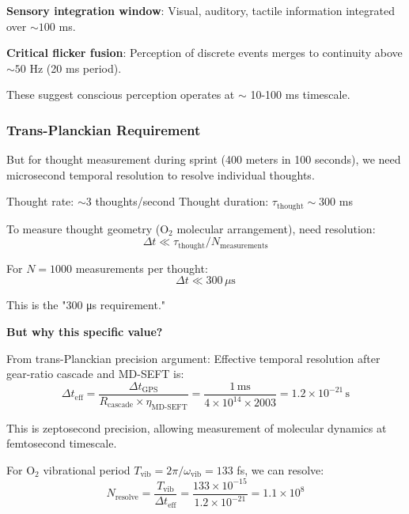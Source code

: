 \documentclass[11pt,onecolumn]{article}
\begin{document}
\textbf{Sensory integration window}: Visual, auditory, tactile information integrated over $\sim 100$ ms.

\textbf{Critical flicker fusion}: Perception of discrete events merges to continuity above $\sim 50$ Hz (20 ms period).

These suggest conscious perception operates at $\sim$ 10-100 ms timescale.

\subsubsection{Trans-Planckian Requirement}

But for thought measurement during sprint (400 meters in 100 seconds), we need microsecond temporal resolution to resolve individual thoughts.

Thought rate: $\sim 3$ thoughts/second
Thought duration: $\tau_{\text{thought}} \sim 300$ ms

To measure thought geometry (O$_2$ molecular arrangement), need resolution:
\begin{equation}
\Delta t \ll \tau_{\text{thought}} / N_{\text{measurements}}
\end{equation}

For $N = 1000$ measurements per thought:
\begin{equation}
\Delta t \ll 300\,\mu\text{s}
\end{equation}

This is the "300 μs requirement."

\textbf{But why this specific value?}

From trans-Planckian precision argument: Effective temporal resolution after gear-ratio cascade and MD-SEFT is:
\begin{equation}
\Delta t_{\text{eff}} = \frac{\Delta t_{\text{GPS}}}{R_{\text{cascade}} \times \eta_{\text{MD-SEFT}}} = \frac{1\,\text{ms}}{4 \times 10^{14} \times 2003} = 1.2 \times 10^{-21}\,\text{s}
\end{equation}

This is zeptosecond precision, allowing measurement of molecular dynamics at femtosecond timescale.

For O$_2$ vibrational period $T_{\text{vib}} = 2\pi/\omega_{\text{vib}} = 133$ fs, we can resolve:
\begin{equation}
N_{\text{resolve}} = \frac{T_{\text{vib}}}{\Delta t_{\text{eff}}} = \frac{133 \times 10^{-15}}{1.2 \times 10^{-21}} = 1.1 \times 10^8
\end{equation}
\end{document}

